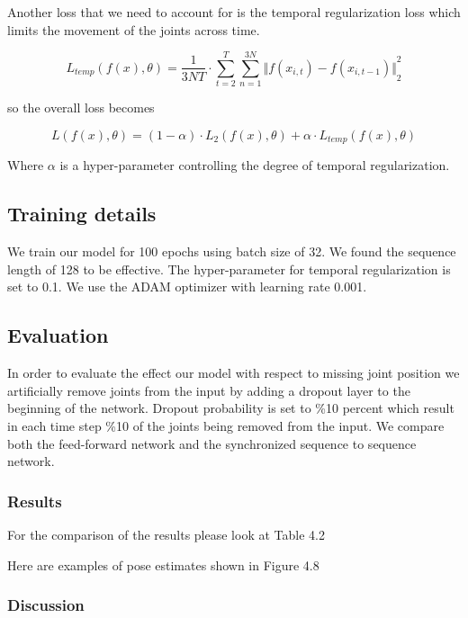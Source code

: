 Another loss that we need to account for is the temporal regularization loss which limits the movement of the joints across time.

\begin{equation}	
    L_{temp}(f(x),\theta) = \frac{1}{3NT} \cdot \sum_{t=2}^{T} \sum_{n=1}^{3N} {\Vert f(x_{i,t})-f(x_{i,t-1}) \Vert}_2^2
\end{equation}

so the overall loss becomes 

\begin{equation}	
    L(f(x),\theta) = (1-\alpha) \cdot L_2(f(x),\theta) + \alpha \cdot L_{temp}(f(x),\theta)
\end{equation}

Where $\alpha$ is a hyper-parameter controlling the degree of temporal regularization.

\subsection{Training details}

We train our model for 100 epochs using batch size of 32. We found the sequence length of 128 to be effective. The hyper-parameter for temporal regularization is set to 0.1. We use the ADAM optimizer with learning rate 0.001. 

\subsection{Evaluation}

In order to evaluate the effect our model with respect to missing joint position we artificially remove joints from the input by adding a dropout layer to the beginning of the network. Dropout probability is set to \%10 percent which result in each time step \%10 of the joints being removed from the input. We compare both the feed-forward network and the synchronized sequence to sequence network.

\subsubsection{Results}

For the comparison of the results please look at Table 4.2

Here are examples of pose estimates shown in Figure 4.8

\subsubsection{Discussion}

